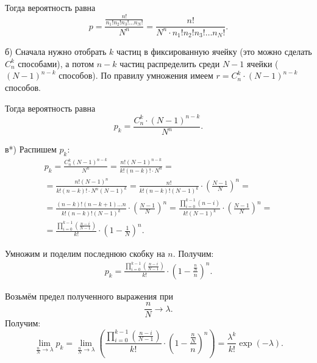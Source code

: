 \documentclass{book}
\begin{document}
Тогда вероятность равна
$$p =
\frac{\frac{n!}{n_1! n_2! n_3! \dotsc n_N!}}{N^n} =
\frac{n!}{N^n \cdot n_1! n_2! n_3! \dotsc n_N!}.$$

б) Сначала нужно отобрать $k$ частиц в фиксированную ячейку
(это можно сделать $C_n^k$ способами),
а потом $n - k$ частиц распределить среди $N - 1$ ячейки
($ \left( N - 1\right)^{n-k}$ способов).
По правилу умножения имеем $r = C_n^k \cdot \left( N-1 \right)^{n-k}$ способов.

Тогда вероятность равна
$$p_k =
\frac{C_n^k \cdot \left( N-1 \right)^{n-k}}{N^n}.$$

в*) Распишем $p_k$:
\begin{equation*}
\begin{split}
p_k =
\frac{C_n^k \left( N-1 \right)^{n-k}}{N^n} =
\frac{n! \left( N-1 \right)^{n-k}}{k! \left( n-k \right)! \cdot N^n} = \\
= \frac{n! \left( N-1 \right)^n}{k! \left( n-k \right)! \cdot N^n \left( N-1 \right)^k} =
\frac{n!}{k! \left( n-k \right)! \left( N-1 \right)^k} \cdot \left( \frac{N-1}{N} \right)^n = \\
= \frac{ \left( n-k \right)! \left( n-k+1 \right) \dotsc n}{k! \left( n-k \right)! \left( N-1 \right)^k} \cdot \left(\frac{N-1}{N} \right)^n =
\frac{ \prod \limits_{i=0}^{k-1} \left( n-i \right) }{k! \left( N-1 \right)^k} \cdot \left( \frac{N-1}{N} \right)^n = \\
= \frac{ \prod \limits_{i=0}^{k-1} \left( \frac{n-i}{N-1} \right)}{k!} \cdot \left( 1 - \frac{1}{N} \right)^n.
\end{split}
\end{equation*}

Умножим и поделим последнюю скобку на $n$.
Получим:
\begin{equation*}
\begin{split}
p_k =
\frac{ \prod \limits_{i=0}^{k-1} \left( \frac{n-i}{N-1} \right)}{k!} \cdot \left( 1 - \frac{ \frac{n}{N} }{n} \right)^n.
\end{split}
\end{equation*}

Возьмём предел полученного выражения при 
$$ \frac{n}{N} \rightarrow \lambda.$$
Получим:
$$ \lim \limits_{ \frac{n}{N} \rightarrow \lambda } p_k =
\lim \limits_{ \frac{n}{N} \rightarrow \lambda }
\left( \frac{ \prod \limits_{i=0}^{k-1} \left( \frac{n-i}{N-1} \right)}{k!} \cdot \left( 1 - \frac{ \frac{n}{N} }{n} \right)^n \right) =
\frac{ \lambda^k}{k!} \exp \left( - \lambda \right).$$
\end{document}
